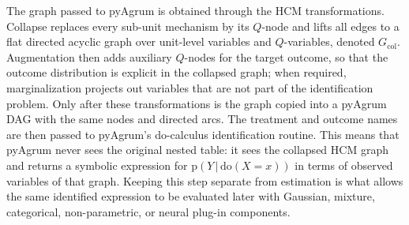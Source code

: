 \documentclass[unnumsec,webpdf,contemporary,large]{oup-authoring-template}%
\theoremstyle{thmstyleone}%
\theoremstyle{thmstyletwo}%
\theoremstyle{thmstylethree}%
\newcommand{\rmdo}{\mathrm{do}}
\newcommand{\g}{\,\vert\,}
\newcommand{\pr}{\mathrm{p}}
\newcommand{\col}{\mathrm{col}}
\begin{document}
The graph passed to pyAgrum is obtained through the HCM transformations.
Collapse replaces every sub-unit mechanism by its $Q$-node and lifts all edges to a flat directed acyclic graph over unit-level variables and $Q$-variables, denoted $G_{\col}$.
Augmentation then adds auxiliary $Q$-nodes for the target outcome, so that the outcome distribution is explicit in the collapsed graph; when required, marginalization projects out variables that are not part of the identification problem.
Only after these transformations is the graph copied into a pyAgrum DAG with the same nodes and directed arcs.
The treatment and outcome names are then passed to pyAgrum's do-calculus identification routine.
This means that pyAgrum never sees the original nested table: it sees the collapsed HCM graph and returns a symbolic expression for $\pr(Y\g\rmdo(X=x))$ in terms of observed variables of that graph.
Keeping this step separate from estimation is what allows the same identified expression to be evaluated later with Gaussian, mixture, categorical, non-parametric, or neural plug-in components.
\end{document}
